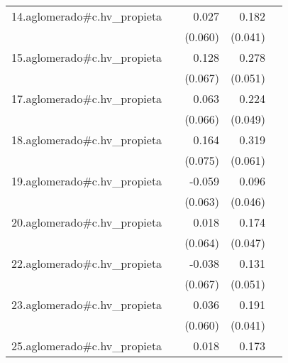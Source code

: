 {\begin{longtable}{l*{4}{D{.}{.}{-1}}}
\addlinespace
14.aglomerado#c.hv\_propieta&                     &       0.027         &       0.182\sym{***}&                     \\
            &                     &     (0.060)         &     (0.041)         &                     \\
\addlinespace
15.aglomerado#c.hv\_propieta&                     &       0.128         &       0.278\sym{***}&                     \\
            &                     &     (0.067)         &     (0.051)         &                     \\
\addlinespace
17.aglomerado#c.hv\_propieta&                     &       0.063         &       0.224\sym{***}&                     \\
            &                     &     (0.066)         &     (0.049)         &                     \\
\addlinespace
18.aglomerado#c.hv\_propieta&                     &       0.164\sym{*}  &       0.319\sym{***}&                     \\
            &                     &     (0.075)         &     (0.061)         &                     \\
\addlinespace
19.aglomerado#c.hv\_propieta&                     &      -0.059         &       0.096\sym{*}  &                     \\
            &                     &     (0.063)         &     (0.046)         &                     \\
\addlinespace
20.aglomerado#c.hv\_propieta&                     &       0.018         &       0.174\sym{***}&                     \\
            &                     &     (0.064)         &     (0.047)         &                     \\
\addlinespace
22.aglomerado#c.hv\_propieta&                     &      -0.038         &       0.131\sym{*}  &                     \\
            &                     &     (0.067)         &     (0.051)         &                     \\
\addlinespace
23.aglomerado#c.hv\_propieta&                     &       0.036         &       0.191\sym{***}&                     \\
            &                     &     (0.060)         &     (0.041)         &                     \\
\addlinespace
25.aglomerado#c.hv\_propieta&                     &       0.018         &       0.173\sym{***}&                     \\

\end{longtable}}
